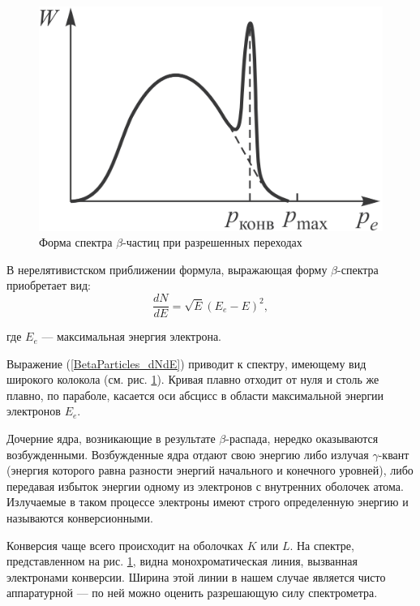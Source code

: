 	\begin{figure}
		\centering
		\includegraphics[width=1\linewidth]{Pictures/W(p)}
		\caption{Форма спектра $\beta$-частиц при разрешенных переходах}
		\label{BetaParticles_Spectre}
	\end{figure}

	В нерелятивистском приближении формула, выражающая форму $\beta$-спектра приобретает вид:
	\begin{equation}
		\frac{dN}{dE} = \sqrt{E}(E_e - E)^2,
		\label{BetaParticles_dNdE}
	\end{equation}

	\noindent где $E_e$ — максимальная энергия электрона.
	
	Выражение (\ref{BetaParticles_dNdE}) приводит к спектру, имеющему вид широкого колокола (см. рис. \ref{BetaParticles_Spectre}). Кривая плавно отходит от нуля и столь же плавно, по параболе, касается оси абсцисс в области максимальной энергии электронов $E_e$.
	
	
	Дочерние ядра, возникающие в результате $\beta$-распада, нередко оказываются возбужденными. Возбужденные ядра отдают свою энергию либо излучая $\gamma$-квант (энергия которого равна разности энергий начального и конечного уровней), либо передавая избыток энергии одному из электронов с внутренних оболочек атома. Излучаемые в таком процессе электроны имеют строго определенную энергию и называются конверсионными.

	Конверсия чаще всего происходит на оболочках $K$ или $L$. На спектре, представленном на рис. \ref{BetaParticles_Spectre}, видна монохроматическая линия, вызванная электронами конверсии. Ширина этой линии в нашем случае является чисто аппаратурной — по ней можно оценить разрешающую силу спектрометра.

